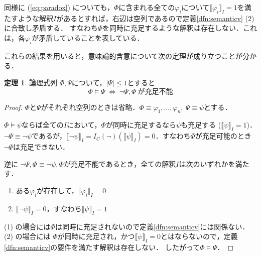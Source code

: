 \documentclass[uplatex,a4paper,dvipdfmx]{jsarticle}
\newcommand{\semvalue}[1]{\llbracket {#1} \rrbracket}
\theoremstyle{definition}
\newtheorem{thm}{定理}
\begin{document}
                同様に (\ref{eq:paradox}) についても，$\Phi$に含まれる全ての$\varphi_i$について$\semvalue{\varphi_i}_I = 1$を満たすような解釈$I$があるとすれば，右辺は空列であるので定義\ref{dfn:semanticv} (2) に合致し矛盾する．
                すなわち$\Phi$を同時に充足するような解釈は存在しない．これは，各$\varphi_i$が矛盾していることを表している．

                これらの結果を用いると，意味論的含意について次の定理が成り立つことが分かる．
                \begin{thm} \label{thm:cantsatisfy}
                    論理式列 $\Phi, \Psi$について，$|\Psi| \le 1$とすると
                    \begin{equation}
                        \Phi \vDash \Psi\ \Longleftrightarrow\ \lnot\Psi, \Phi\ が充足不能
                    \end{equation}
                \end{thm}

                \begin{proof}
                    $\Phi$と$\Psi$がそれぞれ空列のときは省略．$\Phi \equiv \varphi_1,\ldots, \varphi_n,\ \Psi \equiv \psi$とする．

                    $\Phi \vDash \psi$ならば全ての$I$において，$\Phi$が同時に充足するなら$\psi$も充足する ($\semvalue{\psi}_I = 1$)．
                    $\lnot\Psi \equiv \lnot \psi$であるが，$\semvalue{\lnot\psi}_I = I_C(\lnot)(\semvalue{\psi}_I) = 0$．すなわち$\Phi$が充足可能のとき$\lnot\Psi$は充足できない．

                    逆に $\lnot\Psi, \Phi \equiv \lnot\psi, \Phi$が充足不能であるとき，全ての解釈$I$は次のいずれかを満たす．
                    \begin{enumerate}
                        \item ある$\varphi_i$が存在して，$\semvalue{\varphi_i}_I = 0$
                        \item $\semvalue{\lnot\psi}_I = 0$，すなわち$\semvalue{\psi}_I = 1$
                    \end{enumerate}
                    (1) の場合には$\Phi$は同時に充足されないので定義\ref{dfn:semanticv}には関係ない．
                    (2) の場合には $\Phi$が同時に充足され，かつ$\semvalue{\psi}_I = 0$とはならないので，定義\ref{dfn:semanticv}の要件を満たす解釈は存在しない．
                    したがって$\Phi \vDash \Psi$．
                \end{proof}
\end{document}
